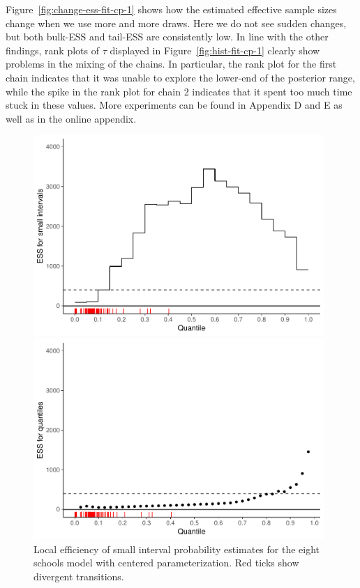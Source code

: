 \documentclass[american,]{article}
\theoremstyle{definition}
\begin{document}
Figure~\ref{fig:change-ess-fit-cp-1} shows how the estimated effective
sample sizes change when we use more and more draws. Here we do not
see sudden changes, but both bulk-ESS and tail-ESS are consistently low. 
In line with the other findings, rank plots of $\tau$ displayed in
Figure~\ref{fig:hist-fit-cp-1} clearly show problems in the mixing of
the chains.  In particular, the rank plot for the first chain indicates that it was unable to 
explore the lower-end of the posterior range, while the spike in the rank plot 
for chain 2 indicates that it spent too much time stuck in these values.
More experiments can be found in Appendix D and E as well as in the online appendix.


\begin{figure}[tp]
  \centering
  \begin{minipage}{0.48\textwidth}
  \includegraphics[width=0.98\textwidth]{graphics/local-ess-fit-cp-1.pdf}
  \caption{Local efficiency of small interval probability estimates for the eight  
  schools model with centered parameterization. Red ticks show divergent transitions.}
  \label{fig:local-ess-fit-cp-1}
\end{minipage}
\hfill
  \begin{minipage}{0.48\textwidth}
  \includegraphics[width=0.98\textwidth]{graphics/quantile-ess-fit-cp-1.pdf}

\end{minipage}
\end{figure}
\end{document}
